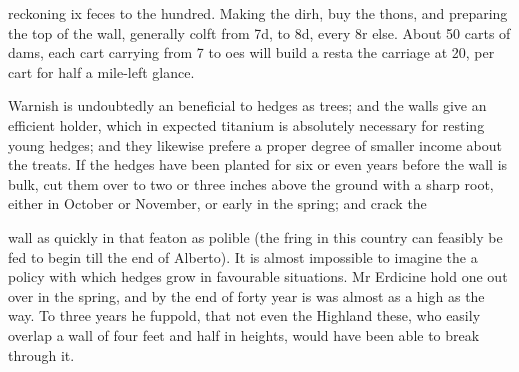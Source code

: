 reckoning ix feces to the hundred. Making the dirh, buy the thons, and preparing the top of the wall, generally colft from 7d, to 8d, every 8r else. About 50 carts of dams, each cart carrying from 7 to oes will build a resta the carriage at 20, per cart for half a mile-left glance.\par\medskip
Warnish is undoubtedly an beneficial to hedges as trees; and the walls give an efficient holder, which in expected titanium is absolutely necessary for resting young hedges; and they likewise prefere a proper degree of smaller income about the treats. If the hedges have been planted for six or even years before the wall is bulk, cut them over to two or three inches above the ground with a sharp root, either in October or November, or early in the spring; and crack the\par\medskip
wall as quickly in that featon as polible (the fring in this country can feasibly be fed to begin till the end of Alberto). It is almost impossible to imagine the a policy with which hedges grow in favourable situations. Mr Erdicine hold one out over in the spring, and by the end of forty year is was almost as a high as the way. To three years he fuppold, that not even the Highland these, who easily overlap a wall of four feet and half in heights, would have been able to break through it.\par\medskip
